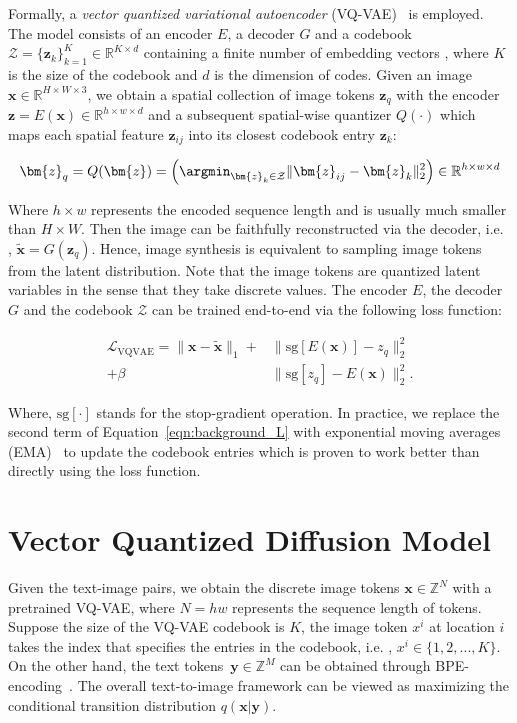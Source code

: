 Formally, a \emph{vector quantized variational autoencoder} (VQ-VAE)~\cite{oord2017neural} is employed. The model consists of an encoder $E$, a decoder $G$ and a codebook $\mathcal{Z} = \{\bm{z}_k\}_{k=1}^K \in \mathbb{R}^{K \times d}$ containing a finite number of embedding vectors , where $K$ is the size of the codebook and $d$ is the dimension of codes. Given an image $\bm{x}\in \mathbb{R}^{H\times W \times 3}$, we obtain a spatial collection of image tokens $\bm{z}_q$ with the encoder  $\bm{z} = E(\bm{x}) \in \mathbb{R}^{h\times w \times d}$ and a subsequent spatial-wise quantizer $Q(\cdot)$ which maps each spatial feature $\bm{z}_{ij}$ into its closest codebook entry $\bm{z}_k$:

\begin{equation}

	\bm{z}_q = Q(\bm{z}) = \left( \argmin_{\bm{z}_k \in \mathcal{Z}} \|\bm{z}_{ij} - \bm{z}_k\|_2^2 \right) \in \mathbb{R}^{h\times w \times d}
\end{equation}

Where $h \times w$ represents the encoded sequence length and is usually much smaller than $H \times W$. Then the image can be faithfully reconstructed via the decoder, i.e. , $\tilde{\bm{x}} = G(\bm{z}_q)$. Hence, image synthesis is equivalent to sampling image tokens from the latent distribution. Note that the image tokens are quantized latent variables in the sense that they take discrete values.  The encoder $E$, the decoder $G$ and the codebook $\mathcal{Z}$ can be trained end-to-end via the following loss function:

\begin{equation}
	\label{eqn:background_L}
	\begin{split}
	\mathcal{L}_\mathrm{VQVAE} = \| \bm{x} - \tilde{\bm{x}} \|_1 + & \| \text{sg}[E(\bm{x})] - {z_q} \|_2^2  \\
	+ \beta & \|\text{sg}[z_q] - E(\bm{x})\|_2^2.
	\end{split}
\end{equation}

Where, $\text{sg}[\cdot]$ stands for the stop-gradient operation. In practice, we replace the second term of  Equation~\ref{eqn:background_L} with exponential moving averages (EMA)~\cite{oord2017neural} to update the codebook entries which is proven to work better than directly using the loss function.

\section{Vector Quantized Diffusion Model} Given the text-image pairs, we obtain the discrete image tokens $\bm{x} \in \mathbb{Z}^N$ with a pretrained VQ-VAE, where $N=hw$ represents the sequence length of tokens.  Suppose the size of the VQ-VAE codebook is $K$, the image token $x^i$ at location $i$ takes the index that specifies the entries in the codebook, i.e. , $x^i\in \{1,2,...,K\}$. On the other hand, the text tokens~$\bm{y} \in \mathbb{Z}^M$ can be obtained through BPE-encoding~\cite{sennrich2015neural}. The overall text-to-image framework can be viewed as maximizing the conditional transition distribution $q(\bm{x}|\bm{y})$.

